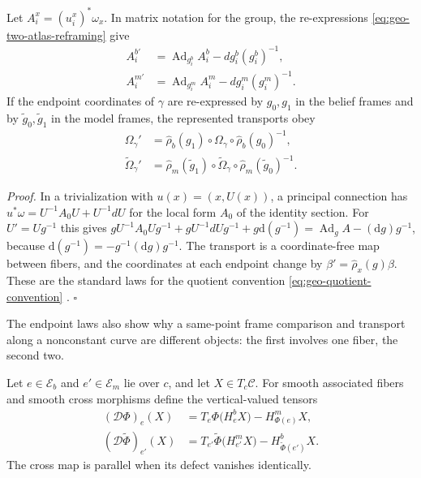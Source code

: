 Let \(A_i^x=(u_i^x)^*\omega_x\). In matrix notation for the group, the re-expressions
\eqref{eq:geo-two-atlas-reframing} give
\begin{align}
A_i^{b\prime}
&=\operatorname{Ad}_{g_i^b}A_i^b-dg_i^b(g_i^b)^{-1},
\label{eq:geo-local-connection-b}\\
A_i^{m\prime}
&=\operatorname{Ad}_{g_i^m}A_i^m-dg_i^m(g_i^m)^{-1}.
\label{eq:geo-local-connection-m}
\end{align}
If the endpoint coordinates of \(\gamma\) are re-expressed by \(g_0,g_1\) in the belief frames and by
\(\widetilde g_0,\widetilde g_1\) in the model frames, the represented transports obey
\begin{align}
\Omega_\gamma'
&=\widehat\rho_b(g_1)\circ\Omega_\gamma\circ\widehat\rho_b(g_0)^{-1},
\label{eq:geo-pt-gauge-b}\\
\widetilde\Omega_\gamma'
&=\widehat\rho_m(\widetilde g_1)\circ\widetilde\Omega_\gamma\circ\widehat\rho_m(\widetilde g_0)^{-1}.
\label{eq:geo-pt-gauge-m}
\end{align}

\noindent\emph{Proof.}
In a trivialization with \(u(x)=(x,U(x))\), a principal connection has
\(u^*\omega=U^{-1}A_0U+U^{-1}dU\) for the local form \(A_0\) of the identity section. For
\(U'=Ug^{-1}\) this gives
\(gU^{-1}A_0Ug^{-1}+gU^{-1}dUg^{-1}+g\mathrm d(g^{-1})=\operatorname{Ad}_gA-(\mathrm dg)g^{-1}\), because
\(\mathrm d(g^{-1})=-g^{-1}(\mathrm dg)g^{-1}\). The transport is a coordinate-free map between fibers, and the
coordinates at each endpoint change by \(\beta'=\widehat\rho_x(g)\beta\). These are the standard laws
for the quotient convention \eqref{eq:geo-quotient-convention}
\citep{Kobayashi1963,Nakahara2003}. \hfill$\square$

The endpoint laws also show why a same-point frame comparison and transport along a nonconstant
curve are different objects: the first involves one fiber, the second two.

Let \(e\in\mathcal E_b\) and \(e'\in\mathcal E_m\) lie over \(c\), and let \(X\in T_c\mathcal C\). For
smooth associated fibers and smooth cross morphisms define the vertical-valued tensors
\begin{align}
(\mathcal D\Phi)_e(X)
&=T_e\Phi\bigl(H_e^bX\bigr)-H_{\Phi(e)}^mX,
\label{eq:geo-nonlinear-defect-phi}\\
(\mathcal D\widetilde\Phi)_{e'}(X)
&=T_{e'}\widetilde\Phi\bigl(H_{e'}^mX\bigr)-H_{\widetilde\Phi(e')}^bX.
\label{eq:geo-nonlinear-defect-tildephi}
\end{align}
The cross map is parallel when its defect vanishes identically.

